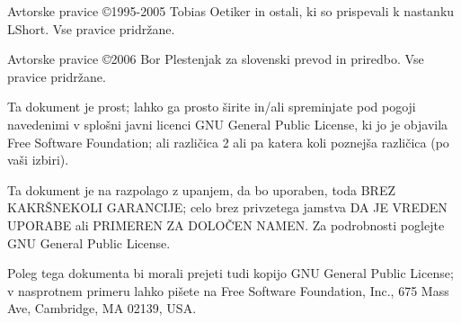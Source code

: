 \begin{small} 
  Avtorske pravice \copyright 1995-2005 Tobias Oetiker in ostali, ki so prispevali k nastanku LShort. 
  Vse pravice pridržane.
 
  Avtorske pravice \copyright 2006 Bor Plestenjak za slovenski prevod in priredbo.
  Vse pravice pridržane.
 
  Ta dokument je prost; lahko ga prosto širite in/ali spreminjate pod
  pogoji navedenimi v splošni javni licenci GNU General Public License, ki jo je objavila 
  Free Software Foundation; ali različica 2 ali pa katera koli poznejša različica (po vaši izbiri).
  
  Ta dokument je na razpolago z upanjem, da bo uporaben, toda BREZ KAKRŠNEKOLI GARANCIJE;
  celo brez privzetega jamstva DA JE VREDEN UPORABE ali PRIMEREN ZA DOLOČEN NAMEN\@.  
  Za podrobnosti poglejte GNU General Public License.
  
  Poleg tega dokumenta bi morali prejeti tudi kopijo GNU General Public License; v nasprotnem primeru lahko pišete 
  na Free Software Foundation, Inc., 675 Mass Ave, Cambridge, MA 02139, USA.
\end{small}


\endinput

%

